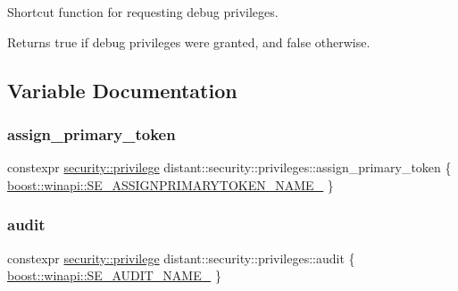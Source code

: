 Shortcut function for requesting debug privileges. 

\begin{DoxyReturn}{Returns}
true if debug privileges were granted, and false otherwise. 
\end{DoxyReturn}


\subsection{Variable Documentation}
\mbox{\label{namespacedistant_1_1security_1_1privileges_a083e03c406f90c902757d375738e9822}} 
\subsubsection{\texorpdfstring{assign\+\_\+primary\+\_\+token}{assign\_primary\_token}}
{\footnotesize\ttfamily constexpr \mbox{\hyperlink{classdistant_1_1security_1_1privilege}{security\+::privilege}} distant\+::security\+::privileges\+::assign\+\_\+primary\+\_\+token \{ \mbox{\hyperlink{namespaceboost_1_1winapi_afe48801f5eea017990b6f74ece34dee4}{boost\+::winapi\+::\+S\+E\+\_\+\+A\+S\+S\+I\+G\+N\+P\+R\+I\+M\+A\+R\+Y\+T\+O\+K\+E\+N\+\_\+\+N\+A\+M\+E\+\_\+}} \}}

\mbox{\label{namespacedistant_1_1security_1_1privileges_abe8f0a3d6fe9358fa2f8ca022a59b997}} 
\subsubsection{\texorpdfstring{audit}{audit}}
{\footnotesize\ttfamily constexpr \mbox{\hyperlink{classdistant_1_1security_1_1privilege}{security\+::privilege}} distant\+::security\+::privileges\+::audit \{ \mbox{\hyperlink{namespaceboost_1_1winapi_a1f2a008a33dfb6f089f034173b880da8}{boost\+::winapi\+::\+S\+E\+\_\+\+A\+U\+D\+I\+T\+\_\+\+N\+A\+M\+E\+\_\+}} \}}

\mbox{\label{namespacedistant_1_1security_1_1privileges_a1e9b69ee700d417418934369f501db01}} 
